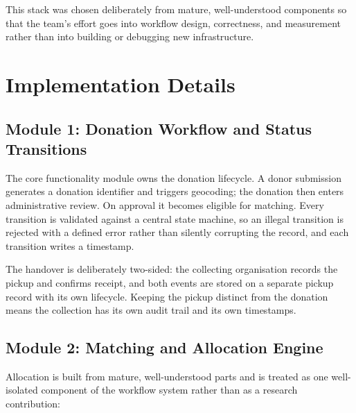 \documentclass[12pt,a4paper]{report}
\begin{document}
This stack was chosen deliberately from mature, well-understood components so that the team's effort goes into workflow design, correctness, and measurement rather than into building or debugging new infrastructure.

\section{Implementation Details}

\subsection{Module 1: Donation Workflow and Status Transitions}

The core functionality module owns the donation lifecycle. A donor submission generates a donation identifier and triggers geocoding; the donation then enters administrative review. On approval it becomes eligible for matching. Every transition is validated against a central state machine, so an illegal transition is rejected with a defined error rather than silently corrupting the record, and each transition writes a timestamp.

The handover is deliberately two-sided: the collecting organisation records the pickup and confirms receipt, and both events are stored on a separate pickup record with its own lifecycle. Keeping the pickup distinct from the donation means the collection has its own audit trail and its own timestamps.

\subsection{Module 2: Matching and Allocation Engine}

Allocation is built from mature, well-understood parts and is treated as one well-isolated component of the workflow system rather than as a research contribution:
\end{document}
